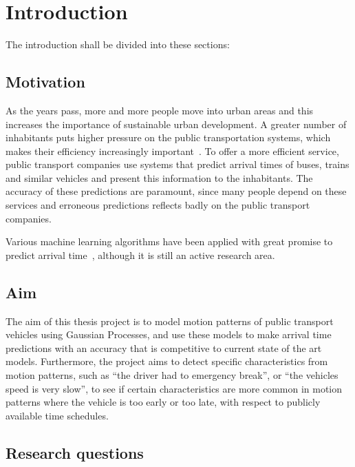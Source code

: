\chapter{Introduction}
\label{cha:introduction}

The introduction shall be divided into these sections:

\section{Motivation}
\label{sec:motivation}
As the years pass, more and more people move into urban areas and this
increases the importance of sustainable urban development. A greater
number of inhabitants puts higher pressure on the public
transportation systems, which makes their efficiency increasingly
important~\cite{kondepudi2014smart}. To offer a more efficient
service, public transport companies use systems
that predict arrival times of buses, trains and similar vehicles
and present this information to the inhabitants. The accuracy of these predictions are paramount, 
since many people depend on these services and erroneous predictions reflects badly on the
public transport companies. 

Various machine learning algorithms have been applied with great
promise to predict arrival time~\cite{zheng2013urban, kim2017probabilistic, pang2018learning,
  Nguyen2018Jun}, although it is still an active research area.

\section{Aim}
\label{sec:aim}

The aim of this thesis project is to model motion patterns of public
transport vehicles using Gaussian Processes, and use these
models to make arrival time predictions with an accuracy that is
competitive to current state of the art models. Furthermore, the project aims to
detect specific characteristics from motion patterns, such as ``the
driver had to emergency break'', or ``the vehicles speed is very slow'', to see if certain characteristics
are more common in motion patterns where the vehicle is too early or
too late, with respect to publicly available time schedules.

\section{Research questions}
\label{sec:research-questions}

